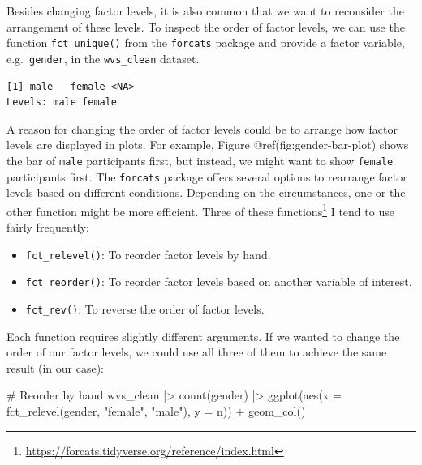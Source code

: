 \documentclass[
  letterpaper,
]{krantz}
\makeatletter
\newenvironment{Shaded}{\begin{snugshade}}{\end{snugshade}}
\newcommand{\AttributeTok}[1]{\textcolor[rgb]{0.40,0.45,0.13}{#1}}
\newcommand{\CommentTok}[1]{\textcolor[rgb]{0.37,0.37,0.37}{#1}}
\newcommand{\FunctionTok}[1]{\textcolor[rgb]{0.28,0.35,0.67}{#1}}
\newcommand{\NormalTok}[1]{\textcolor[rgb]{0.00,0.23,0.31}{#1}}
\newcommand{\SpecialCharTok}[1]{\textcolor[rgb]{0.37,0.37,0.37}{#1}}
\newcommand{\StringTok}[1]{\textcolor[rgb]{0.13,0.47,0.30}{#1}}
\renewcommand{\href}[2]{#2\footnote{\url{#1}}}
\newenvironment{kframe}{%
\medskip{}
\setlength{\fboxsep}{.8em}
 \def\at@end@of@kframe{}%
 \ifinner\ifhmode%
  \def\at@end@of@kframe{\end{minipage}}%
  \begin{minipage}{\columnwidth}%
 \fi\fi%
 \def\FrameCommand##1{\hskip\@totalleftmargin \hskip-\fboxsep
 \colorbox{shadecolor}{##1}\hskip-\fboxsep
     \hskip-\linewidth \hskip-\@totalleftmargin \hskip\columnwidth}%
 \MakeFramed {\advance\hsize-\width
   \@totalleftmargin\z@ \linewidth\hsize
   \@setminipage}}%
 {\par\unskip\endMakeFramed%
 \at@end@of@kframe}
\renewenvironment{Shaded}{\begin{kframe}}{\end{kframe}}
\makeatother
\begin{document}
Besides changing factor levels, it is also common that we want to
reconsider the arrangement of these levels. To inspect the order of
factor levels, we can use the function \texttt{fct\_unique()} from the
\texttt{forcats} package and provide a factor variable,
e.g.~\texttt{gender}, in the \texttt{wvs\_clean} dataset.

\begin{Shaded}
\end{Shaded}

\begin{verbatim}
[1] male   female <NA>  
Levels: male female
\end{verbatim}

A reason for changing the order of factor levels could be to arrange how
factor levels are displayed in plots. For example, Figure
@ref(fig:gender-bar-plot) shows the bar of \texttt{male} participants
first, but instead, we might want to show \texttt{female} participants
first. The \texttt{forcats} package offers several options to rearrange
factor levels based on different conditions. Depending on the
circumstances, one or the other function might be more efficient. Three
of \href{https://forcats.tidyverse.org/reference/index.html}{these
functions} I tend to use fairly frequently:

\begin{itemize}
\item
  \texttt{fct\_relevel()}: To reorder factor levels by hand.
\item
  \texttt{fct\_reorder()}: To reorder factor levels based on another
  variable of interest.
\item
  \texttt{fct\_rev()}: To reverse the order of factor levels.
\end{itemize}

Each function requires slightly different arguments. If we wanted to
change the order of our factor levels, we could use all three of them to
achieve the same result (in our case):

\begin{Shaded}
\begin{Highlighting}[]
\CommentTok{\# Reorder by hand}
\NormalTok{wvs\_clean }\SpecialCharTok{|\textgreater{}}
  \FunctionTok{count}\NormalTok{(gender) }\SpecialCharTok{|\textgreater{}}
  \FunctionTok{ggplot}\NormalTok{(}\FunctionTok{aes}\NormalTok{(}\AttributeTok{x =} \FunctionTok{fct\_relevel}\NormalTok{(gender, }\StringTok{"female"}\NormalTok{, }\StringTok{"male"}\NormalTok{),}
             \AttributeTok{y =}\NormalTok{ n)) }\SpecialCharTok{+}
  \FunctionTok{geom\_col}\NormalTok{()}
\end{Highlighting}
\end{Shaded}
\end{document}
